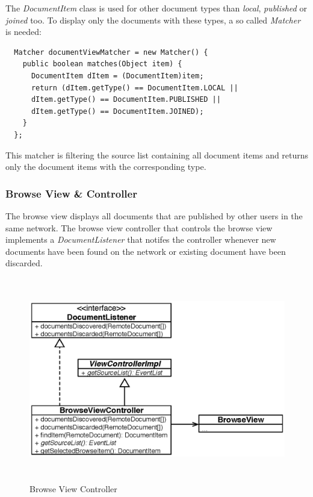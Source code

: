 The \textit{DocumentItem} class is used for other document types than \textit{local}, \textit{published} or \textit{joined} too. To display only the documents with these types, a so called \textit{Matcher} is needed:
\begin{verbatim}
  Matcher documentViewMatcher = new Matcher() {
    public boolean matches(Object item) {
      DocumentItem dItem = (DocumentItem)item;
      return (dItem.getType() == DocumentItem.LOCAL ||
      dItem.getType() == DocumentItem.PUBLISHED ||
      dItem.getType() == DocumentItem.JOINED);
    }
  };
\end{verbatim}
This matcher is filtering the source list containing all document items and returns only the document items with the corresponding type.

\subsubsection{Browse View \& Controller}
The browse view displays all documents that are published by other users in the same network. The browse view controller that controls the browse view implements a \textit{DocumentListener} that notifes the controller whenever new documents have been found on the network or existing document have been discarded.
\begin{figure}[H]
\begin{center}
  \includegraphics[height=3.5in, width=5.62in]{../images/finalreport/application_browseview.eps}
\caption{Browse View Controller}
\label{application_browseview}
\end{center}
\end{figure}


